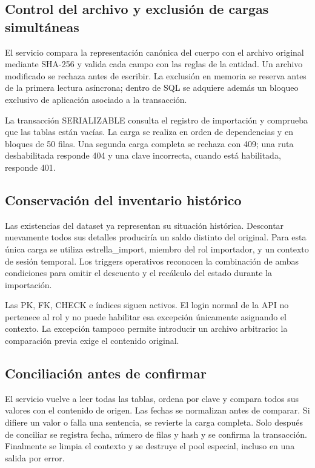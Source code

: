 \documentclass[10pt,letterpaper]{article}
\begin{document}
\subsection{Control del archivo y exclusión de cargas simultáneas}
El servicio compara la representación canónica del cuerpo con el archivo original mediante SHA-256 y valida cada campo con las reglas de la entidad. Un archivo modificado se rechaza antes de escribir. La exclusión en memoria se reserva antes de la primera lectura asíncrona; dentro de SQL se adquiere además un bloqueo exclusivo de aplicación asociado a la transacción.

La transacción SERIALIZABLE consulta el registro de importación y comprueba que las tablas están vacías. La carga se realiza en orden de dependencias y en bloques de 50 filas. Una segunda carga completa se rechaza con 409; una ruta deshabilitada responde 404 y una clave incorrecta, cuando está habilitada, responde 401.

\subsection{Conservación del inventario histórico}
Las existencias del dataset ya representan su situación histórica. Descontar nuevamente todos sus detalles produciría un saldo distinto del original. Para esta única carga se utiliza estrella\_import, miembro del rol importador, y un contexto de sesión temporal. Los triggers operativos reconocen la combinación de ambas condiciones para omitir el descuento y el recálculo del estado durante la importación.

Las PK, FK, CHECK e índices siguen activos. El login normal de la API no pertenece al rol y no puede habilitar esa excepción únicamente asignando el contexto. La excepción tampoco permite introducir un archivo arbitrario: la comparación previa exige el contenido original.

\subsection{Conciliación antes de confirmar}
El servicio vuelve a leer todas las tablas, ordena por clave y compara todos sus valores con el contenido de origen. Las fechas se normalizan antes de comparar. Si difiere un valor o falla una sentencia, se revierte la carga completa. Solo después de conciliar se registra fecha, número de filas y hash y se confirma la transacción. Finalmente se limpia el contexto y se destruye el pool especial, incluso en una salida por error.
\end{document}

